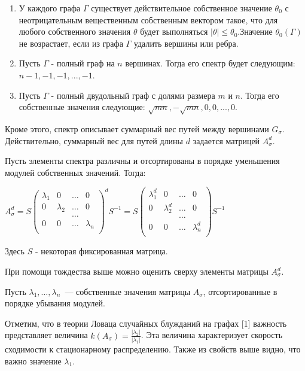 \documentclass[a4paper,12pt]{report}
\theoremstyle{plain} %
\theoremstyle{definition}
\theoremstyle{remark}
\begin{document}
\begin{large}
\begin{enumerate}
\item У каждого графа $\Gamma$ существует действительное собственное значение $\theta_0$ с неотрицательным вещественным собственным вектором такое, что для любого собственного значения $\theta$ будет выполняться $|\theta| \leq \theta_0$.Значение $\theta_0(\Gamma)$ не возрастает, если из графа $\Gamma$ удалить вершины или ребра.

\item Пусть $\Gamma$ - полный граф на $n$ вершинах. Тогда его спектр будет следующим: $n-1,-1,-1,...,-1$.

\item Пусть $\Gamma$ - полный двудольный граф  с долями размера $m$ и $n$. Тогда его собственные значения следующие: $\sqrt{mn}, -\sqrt{mn},0,0,...,0.$

\end{enumerate}

Кроме этого, спектр описывает суммарный вес путей между вершинами $G_{\sigma}$. Действительно, суммарный вес для путей длины $d$ задается матрицей $A_{\sigma}^d$.

Пусть элементы спектра различны и отсортированы в порядке уменьшения модулей собственных значений. Тогда:

$A_{\sigma}^d = S \begin{pmatrix} 
\lambda_1 & 0 & \ldots & 0\\ 
0 & \lambda_2 & \ldots & 0\\
  &     & \ldots &\\
0 &  0  & \ldots & \lambda_n\\
\end{pmatrix}^d S^{-1} =  S \begin{pmatrix} 
\lambda^d_1 & 0 & \ldots & 0\\ 
0 & \lambda^d_2 & \ldots & 0\\
  &     & \ldots &\\
0 &  0  & \ldots & \lambda^d_n\\
\end{pmatrix} S^{-1}$

Здесь $S$ - некоторая фиксированная матрица. 

При помощи тождества выше можно оценить сверху элементы матрицы $A_{\sigma}^d$.

Пусть $\lambda_1,\ldots, \lambda_n$~--- 
собственные значения матрицы $A_\sigma$,
отсортированные в порядке убывания модулей. 

Отметим, что в теории Ловаца  случайных блужданий на графах [1] важность представляет величина $k(A_{\sigma}) = \frac{|\lambda_2|}{|\lambda_1|}$. Эта величина характеризует скорость сходимости к стационарному распределению. Также из свойств выше видно, что важно значение $\lambda_1$. 


\end{large}
\end{document}
